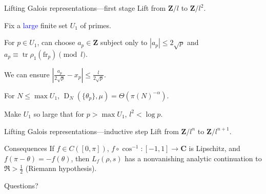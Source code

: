 \documentclass[handout]{beamer}
\DeclareMathOperator{\D}{D}
\DeclareMathOperator{\tr}{tr}
\newcommand{\bC}{\mathbf{C}}
\newcommand{\bZ}{\mathbf{Z}}
\newcommand{\frob}{\mathrm{fr}}
\begin{document}
\begin{frame}{Lifting Galois representations---first stage}
Lift from $\bZ/l$ to $\bZ/l^2$. 
\pause

Fix a \textcolor{blue}{large} finite set $U_1$ of primes. 
\pause

For $p\in U_1$, can choose $a_p\in \bZ$ subject only to 
$|a_p|\leqslant 2\sqrt p$ and $a_p\equiv \tr\rho_1(\frob_p)\pmod{l}$. 
\pause

We can ensure 
$\left| \frac{a_p}{2\sqrt p} - x_p\right| \leqslant \frac{l}{2\sqrt p}$.
\pause

For $N\leqslant \max U_1$, $\D_N(\{\theta_p\},\mu) = \Theta(\pi(N)^{-\alpha})$. 
\pause

Make $U_1$ so large that for $p>\max U_1$, $l^2 < \log p$. 
\end{frame}


\begin{frame}{Lifting Galois representations---inductive step}
Lift from $\bZ/l^n$ to $\bZ/l^{n+1}$. 
\end{frame}


\begin{frame}{Consequences}
If $f\in C([0,\pi])$, $f\circ \cos^{-1}\colon [-1,1]\to \bC$ is Lipschitz, and 
$f(\pi-\theta) = - f(\theta)$, then $L_f(\rho,s)$ has a nonvanishing analytic 
continuation to $\Re > \frac 1 2$ (Riemann hypothesis). 
\end{frame}





\begin{frame}
\begin{center}
\Huge Questions?
\end{center}
\end{frame}
\end{document}

